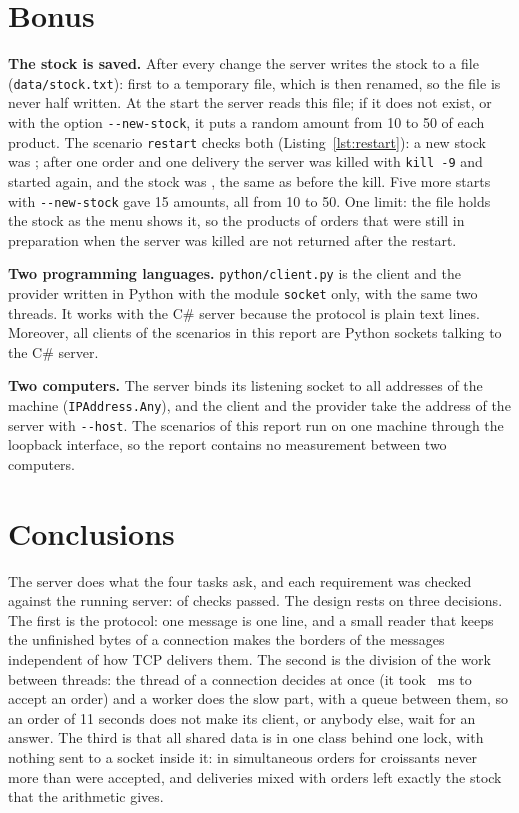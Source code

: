 \documentclass[12pt,a4paper]{article}
\begin{document}
\section{Bonus}
\label{sec:bonus}

\textbf{The stock is saved.} After every change the server writes the stock to a file (\texttt{data/stock.txt}): first to a temporary file, which is then renamed, so the file is never half written. At the start the server reads this file; if it does not exist, or with the option \texttt{-{}-new-stock}, it puts a random amount from 10 to 50 of each product. The scenario \texttt{restart} checks both (Listing~\ref{lst:restart}): a new stock was \texttt{\restartFirst}; after one order and one delivery the server was killed with \texttt{kill -9} and started again, and the stock was \texttt{\restartAfter}, the same as before the kill. Five more starts with \texttt{-{}-new-stock} gave 15 amounts, all from 10 to 50. One limit: the file holds the stock as the menu shows it, so the products of orders that were still in preparation when the server was killed are not returned after the restart.



\textbf{Two programming languages.} \texttt{python/client.py} is the client and the provider written in Python with the module \texttt{socket} only, with the same two threads. It works with the C\# server because the protocol is plain text lines. Moreover, all clients of the scenarios in this report are Python sockets talking to the C\# server.

\textbf{Two computers.} The server binds its listening socket to all addresses of the machine (\texttt{IPAddress.Any}), and the client and the provider take the address of the server with \texttt{-{}-host}. The scenarios of this report run on one machine through the loopback interface, so the report contains no measurement between two computers.

\section{Conclusions}

The server does what the four tasks ask, and each requirement was checked against the running server: \checksPassed{} of \checksTotal{} checks passed. The design rests on three decisions. The first is the protocol: one message is one line, and a small reader that keeps the unfinished bytes of a connection makes the borders of the messages independent of how TCP delivers them. The second is the division of the work between threads: the thread of a connection decides at once (it took \oneAnswerMs~ms to accept an order) and a worker does the slow part, with a queue between them, so an order of 11 seconds does not make its client, or anybody else, wait for an answer. The third is that all shared data is in one class behind one lock, with nothing sent to a socket inside it: in \raceOrders{} simultaneous orders for \raceCroissants{} croissants never more than \raceCroissants{} were accepted, and \consDeliveries{} deliveries mixed with \consOrders{} orders left exactly the stock that the arithmetic gives.
\end{document}
